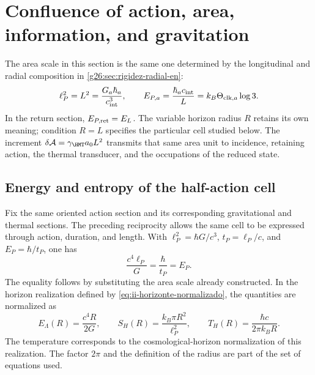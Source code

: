 \section{Confluence of action, area, information, and gravitation}
\label{sec:confluencia}

The area scale in this section is the same one determined by the
longitudinal and radial composition in \ref{g26:sec:rigidez-radial-en}:
\begin{equation}
 \ell_P^2=L^2=\frac{G_a\hbar_a}{c_{\rm int}^3},\qquad
 E_{P,a}=\frac{\hbar_a c_{\rm int}}{L}
        =k_B\Theta_{{\rm clk},a}\log3.
 \label{eq:ii-g26-longitud-energia-area}
\end{equation}
In the return section, \(E_{P,\rm ret}=E_L\). The variable horizon
radius \(R\) retains its own meaning; condition \(R=L\) specifies
the particular cell studied below. The increment
\(\delta\mathcal A=\gamma_{\HMT}a_0L^2\) transmits that same area
unit to incidence, retaining action, the thermal transducer, and the
occupations of the reduced state.

\subsection{Energy and entropy of the half-action cell}

Fix the same oriented action section and its corresponding
gravitational and thermal sections. The preceding reciprocity allows the same cell to be expressed through
action, duration, and length. With
\(\ell_P^2=\hbar G/c^3\), \(t_P=\ell_P/c\), and
\(E_P=\hbar/t_P\), one has
\[
 \frac{c^4\ell_P}{G}=\frac{\hbar}{t_P}=E_P.
\]
The equality follows by substituting the area scale already constructed. In the
horizon realization defined by \eqref{eq:ii-horizonte-normalizado}, the quantities
are normalized as
\begin{equation}
 E_\Lambda(R)=\frac{c^4R}{2G},\qquad
 S_H(R)=\frac{k_B\pi R^2}{\ell_P^2},\qquad
 T_H(R)=\frac{\hbar c}{2\pi k_BR}.
 \label{eq:ii-horizonte-normalizado}
\end{equation}
The temperature corresponds to the cosmological-horizon normalization
of this realization. The factor \(2\pi\) and the definition of the radius
are part of the set of equations used.

